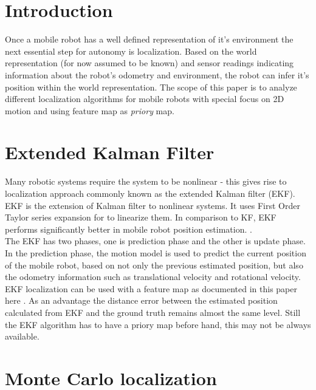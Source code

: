 \documentclass[12pt, a4paper, onecolumn]{article}
\begin{document}
\maketitle

\section{Introduction}

Once a mobile robot has a well defined representation of it's environment the next essential step for autonomy is localization.
Based on the world representation (for now assumed to be known) and sensor readings indicating information about the robot's odometry and environment, the robot can infer it's position within the world representation. 
The scope of this paper is to analyze different localization algorithms for mobile robots with special focus on 2D motion and using feature map as \emph{priory} map.

\section{Extended Kalman Filter}

Many robotic systems require the system to be nonlinear - this gives rise to localization approach commonly known as the extended Kalman filter (EKF).
EKF is the extension of Kalman filter to nonlinear systems. 
It uses First Order Taylor series expansion for to linearize them.
In comparison to KF, EKF performs significantly better in mobile robot position estimation. \cite{Suliman2010}. \\

The EKF has two phases, one is prediction phase and the other is update phase. 
In the prediction phase, the motion model is used to predict the current position of the mobile robot, based on not only the previous estimated position, but also the odometry information such as translational velocity and rotational velocity. \cite{featureEKF} \\

EKF localization can be used with a feature map as documented in this paper here \cite{featureEKF}. 
As an advantage the distance error between the estimated position calculated from EKF and the ground truth remains almost the same level. 
Still the EKF algorithm has to have a priory map before hand, this may not be always available. \cite{featureEKF}

\section{Monte Carlo localization}
\end{document}
